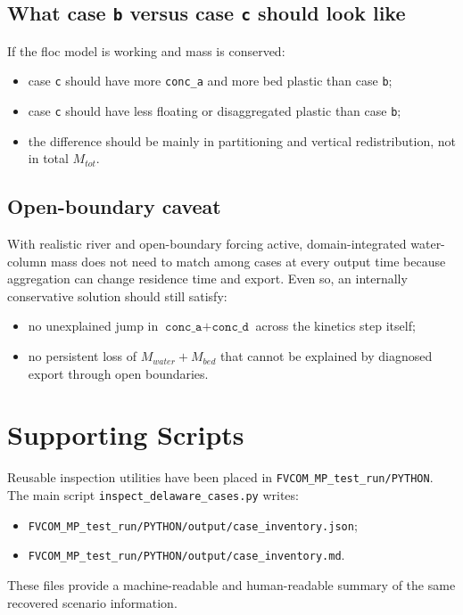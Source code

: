 \documentclass[11pt]{article}
\begin{document}
\subsection{What case \texttt{b} versus case \texttt{c} should look like}
If the floc model is working and mass is conserved:
\begin{itemize}
\item case \texttt{c} should have more \texttt{conc\_a} and more bed plastic than case \texttt{b};
\item case \texttt{c} should have less floating or disaggregated plastic than case \texttt{b};
\item the difference should be mainly in partitioning and vertical redistribution, not in total
\(M_{tot}\).
\end{itemize}

\subsection{Open-boundary caveat}
With realistic river and open-boundary forcing active, domain-integrated water-column mass does not need to
match among cases at every output time because aggregation can change residence time and export. Even so, an
internally conservative solution should still satisfy:
\begin{itemize}
\item no unexplained jump in \(\texttt{conc\_a}+\texttt{conc\_d}\) across the kinetics step itself;
\item no persistent loss of \(M_{water}+M_{bed}\) that cannot be explained by diagnosed export through open
boundaries.
\end{itemize}

\section{Supporting Scripts}
Reusable inspection utilities have been placed in \texttt{FVCOM\_MP\_test\_run/PYTHON}. The main script
\texttt{inspect\_delaware\_cases.py} writes:
\begin{itemize}
\item \texttt{FVCOM\_MP\_test\_run/PYTHON/output/case\_inventory.json};
\item \texttt{FVCOM\_MP\_test\_run/PYTHON/output/case\_inventory.md}.
\end{itemize}

These files provide a machine-readable and human-readable summary of the same recovered scenario information.
\end{document}

